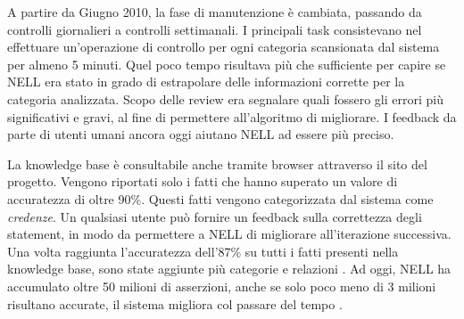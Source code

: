 \noindent A partire da Giugno 2010, la fase di manutenzione è cambiata, passando da controlli giornalieri a controlli settimanali. I principali task consistevano nel effettuare un'operazione di controllo per ogni categoria scansionata dal sistema per almeno 5 minuti. Quel poco tempo risultava più che sufficiente per capire se NELL era stato in grado di estrapolare delle informazioni corrette per la categoria analizzata. Scopo delle review era segnalare quali fossero gli errori più significativi e gravi, al fine di permettere all'algoritmo di migliorare. I feedback da parte di utenti umani ancora oggi aiutano NELL ad essere più preciso.


\noindent La knowledge base è consultabile anche tramite browser attraverso il sito del progetto. Vengono riportati solo i fatti che hanno superato un valore di accuratezza di oltre 90\%. Questi fatti vengono categorizzata dal sistema come \textit{credenze}.\newline
Un qualsiasi utente può fornire un feedback sulla correttezza degli statement, in modo da permettere a NELL di migliorare all'iterazione successiva.
Una volta raggiunta l'accuratezza dell'87\% su tutti i fatti presenti nella knowledge base, sono state aggiunte più categorie e relazioni \cite{ReadtheWebOverview:online}.
Ad oggi, NELL ha accumulato oltre 50 milioni di asserzioni, anche se solo poco meno di 3 milioni risultano accurate, il sistema migliora col passare del tempo \cite{ReadtheWeb:online}.
\newpage